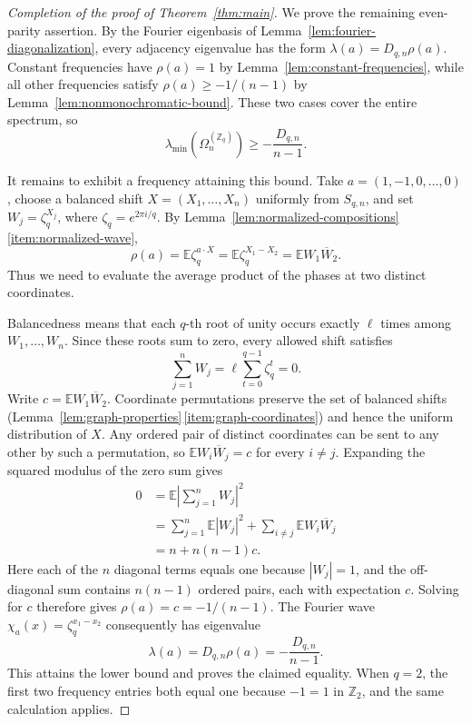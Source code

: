 \documentclass[11pt,a4paper]{article}
\numberwithin{equation}{section}
\numberwithin{figure}{section}
\numberwithin{table}{section}
\numberwithin{footnote}{section}
\theoremstyle{informal}\newtheorem*{informaltheorem}{Informal theorem}
\theoremstyle{definition}\newtheorem{example}{Example}[section]
\theoremstyle{remark}\newtheorem{remark}[theorem]{Remark}
\newcommand{\Z}{\mathbb Z}
\newcommand{\E}{\mathbb E}
\newcommand{\Om}{\Omega_n^{(\Z_q)}}
\begin{document}
\begin{proof}[Completion of the proof of Theorem~\ref{thm:main}]
We prove the remaining even-parity assertion. By the Fourier eigenbasis
of Lemma~\ref{lem:fourier-diagonalization}, every adjacency eigenvalue
has the form \(\lambda(a)=D_{q,n}\rho(a)\).
Constant frequencies have \(\rho(a)=1\) by
Lemma~\ref{lem:constant-frequencies}, while all other frequencies
satisfy \(\rho(a)\geq-1/(n-1)\) by
Lemma~\ref{lem:nonmonochromatic-bound}. These two cases cover the
entire spectrum, so
\begin{equation}
 \lambda_{\min}(\Om)\geq-\frac{D_{q,n}}{n-1}.
\end{equation}

It remains to exhibit a frequency attaining this bound. Take
\(a=(1,-1,0,\ldots,0)\), choose a balanced shift
\(X=(X_1,\ldots,X_n)\) uniformly from \(S_{q,n}\), and set
\(W_j=\zeta_q^{X_j}\), where \(\zeta_q=e^{2\pi i/q}\).
By Lemma~\ref{lem:normalized-compositions}\,\ref{item:normalized-wave},
\begin{equation}
 \rho(a)=\E\zeta_q^{a\cdot X}
        =\E\zeta_q^{X_1-X_2}
        =\E W_1\overline W_2.
\end{equation}
Thus we need to evaluate the average product of the phases at two
distinct coordinates.

Balancedness means that each \(q\)-th root of unity occurs exactly
\(\ell\) times among \(W_1,\ldots,W_n\). Since these roots sum to
zero, every allowed shift satisfies
\begin{equation}
 \sum_{j=1}^nW_j=\ell\sum_{t=0}^{q-1}\zeta_q^t=0.
\end{equation}
Write \(c=\E W_1\overline W_2\). Coordinate permutations preserve
the set of balanced shifts
(Lemma~\ref{lem:graph-properties}\,\ref{item:graph-coordinates})
and hence the uniform distribution of \(X\). Any ordered pair of
distinct coordinates can be sent to any other by such a permutation,
so \(\E W_i\overline W_j=c\) for every \(i\ne j\).
Expanding the squared modulus of the zero sum gives
\begin{equation}
 \begin{aligned}
 0&=\E\left|\sum_{j=1}^nW_j\right|^2\\
  &=\sum_{j=1}^n\E|W_j|^2
    +\sum_{i\ne j}\E W_i\overline W_j\\
  &=n+n(n-1)c.
 \end{aligned}
\end{equation}
Here each of the \(n\) diagonal terms equals one because
\(|W_j|=1\), and the off-diagonal sum contains \(n(n-1)\)
ordered pairs, each with expectation \(c\).
Solving for \(c\) therefore gives \(\rho(a)=c=-1/(n-1)\).
The Fourier wave \(\chi_a(x)=\zeta_q^{x_1-x_2}\) consequently
has eigenvalue
\begin{equation}
 \lambda(a)=D_{q,n}\rho(a)=-\frac{D_{q,n}}{n-1}.
\end{equation}
This attains the lower bound and proves the claimed equality.
When \(q=2\), the first two frequency entries both equal one
because \(-1=1\) in \(\Z_2\), and the same calculation applies.
\end{proof}
\end{document}
